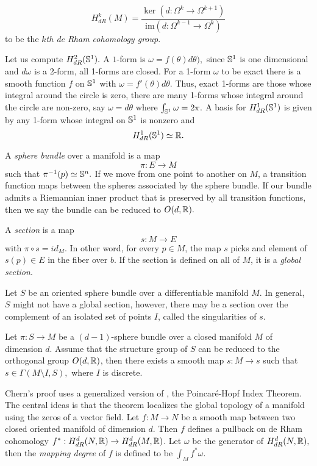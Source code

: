 $$H_{dR}^k(M)=\frac{\ker(d:\Omega^{k}\rightarrow \Omega^{k+1})}{\text{im}(d:\Omega^{k-1}\rightarrow \Omega^k)}$$
to be the \emph{$k$th de Rham cohomology group}.

Let us compute $H_{dR}^2(\mathbb{S}^1).$ A $1$-form is $\omega=f(\theta)d\theta),$ since $\mathbb{S}^1$ is one
dimensional and $d\omega$ is a 2-form, all 1-forms are closed. For a 1-form $\omega$ to be exact
there is a smooth function $f$ on $\mathbb{S}^1$ with $\omega=f'(\theta)d\theta$.
Thus, exact 1-forms are those whose integral around the circle is zero, there are many 1-forms
whose integral around the circle are non-zero, say $\omega=d\theta$ where $\int_{\mathbb{S}^1}\omega=2\pi.$
A basis for $H_{dR}^1(\mathbb{S}^1)$ is given by any 1-form whose integral on $\mathbb{S}^1$ is nonzero and
$$H_{dR}^1(\mathbb{S}^1)\simeq \mathbb{R}.$$



A \emph{sphere bundle} over a manifold is a map
$$\pi:E\rightarrow M$$
such that $\pi^{-1}(p)\simeq \mathbb{S}^n.$ 
If we move from one point to another on $M$, a transition function
maps between the spheres associated by the sphere bundle.
If our bundle admits a Riemannian inner product that is preserved
by all transition functions, then we say the bundle can be reduced to $O(d,\mathbb{R}).$

A \emph{section}
is a map
$$s:M\rightarrow E$$
with $\pi \circ s = id_M.$ In other word, for every $p\in M$,
the map $s$ picks and element of $s(p)\in E$ in the fiber over $b$.
If the section is defined on all of $M$, it is a \emph{global section}.

Let $S$ be an oriented sphere bundle over a differentiable manifold $M$.
In general, $S$ might not have a global section, however, there may be a section over
the complement of an isolated set of points $I$, called the singularities of $s$.

\begin{theorem}[Singularities]
Let $\pi: S\rightarrow M$ be a $(d-1)$-sphere bundle over a closed manifold $M$ of dimension $d$.
Assume that the structure group of $S$ can be reduced to the orthogonal group $O(d,\mathbb{R})$, then there exists
a smooth map $s:M\rightarrow s$ such that $s\in \Gamma(M\setminus I, S),$ where $I$ is discrete.
\end{theorem}

Chern's proof uses a generalized version of , the Poincar\'e-Hopf Index Theorem.
The central ideas is that the theorem localizes the global topology of a manifold using the zeros of a vector field.
Let $f:M\rightarrow N$ be a smooth map between two closed oriented manifold of dimension $d$.
Then $f$ defines a pullback on de Rham cohomology $f^*:H_{dR}^d(N,\mathbb{R})\rightarrow H_{dR}^d(M,\mathbb{R})$.
Let $\omega$ be the generator of $H_{dR}^d(N,\mathbb{R}),$ then the \emph{mapping degree}
of $f$ is defined to be $\int_Mf^*\omega.$

